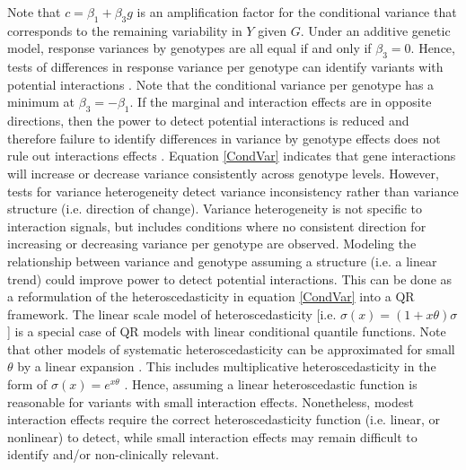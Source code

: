 \documentclass[12pt]{article}
\begin{document}
\begin{appendices}
Note that $c=\beta_1 + \beta_3 g$ is an amplification factor for the conditional variance that corresponds to the remaining variability in $Y$ given $G$. Under an additive genetic model, response variances by genotypes are all equal if and only if $\beta_3 =0$. Hence, tests of differences in response variance per genotype can identify variants with potential interactions \cite{pare2010use, gauderman2013finding}. Note that the conditional variance per genotype has a minimum at $\beta_3 = - \beta_1$. If the marginal and interaction effects are in opposite directions, then the power to detect potential interactions is reduced and therefore failure to identify differences in variance by genotype effects does not rule out interactions effects \cite{struchalin2010variance}. Equation \ref{CondVar} indicates that gene interactions will increase or decrease variance consistently across genotype levels. However, tests for variance heterogeneity detect variance inconsistency rather than variance structure (i.e. direction of change). Variance heterogeneity is not specific to interaction signals, but includes conditions where no consistent direction for increasing or decreasing variance per genotype are observed. Modeling the relationship between variance and genotype assuming a structure (i.e. a linear trend) could improve power to detect potential interactions. This can be done as a reformulation of the heteroscedasticity in equation \ref{CondVar} into a QR framework. The linear scale model of heteroscedasticity [i.e. $\sigma(x) = (1 + x\theta)\sigma$] is a special case of QR models with linear conditional quantile functions. Note that other models of systematic heteroscedasticity can be approximated for small $\theta$ by a linear expansion \cite{koenker1982robust}. This includes multiplicative heteroscedasticity in the form of $\sigma(x) = e^{x\theta}$ \cite{harvey1976estimating, godfrey1978testing}. Hence, assuming a linear heteroscedastic function is reasonable for variants with small interaction effects. Nonetheless, modest interaction effects require the correct heteroscedasticity function (i.e. linear, or nonlinear) to detect, while small interaction effects may remain difficult to identify and/or non-clinically relevant.  


\end{appendices}
\end{document}

